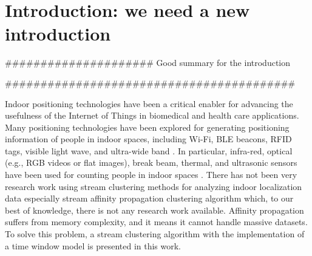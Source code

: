 \setlength{\parindent}{2em}
% 
\chapter{Introduction: we need a new introduction}

#####################
Good summary for the introduction

#########################################

Indoor positioning technologies have been a critical enabler for advancing the usefulness of the Internet of Things in biomedical and health care applications. Many positioning technologies have been explored for generating positioning information of people in indoor spaces, including Wi-Fi, BLE beacons, RFID tags, visible light wave, and ultra-wide band \cite{namiot2015indoor, jeon2018ble}. In particular, infra-red, optical (e.g., RGB videos or flat images), break beam, thermal, and ultrasonic sensors have been used for counting people in indoor spaces \cite{mautz2012indoor}. There has not been very research work using stream clustering methods for analyzing indoor localization data especially stream affinity propagation clustering algorithm \cite{dueck2009affinity} which, to our best of knowledge, there is not any research work available. Affinity propagation suffers from memory complexity, and it means it cannot handle massive datasets. To solve this problem, a stream clustering algorithm with the implementation of a time window model is presented in this work. 


